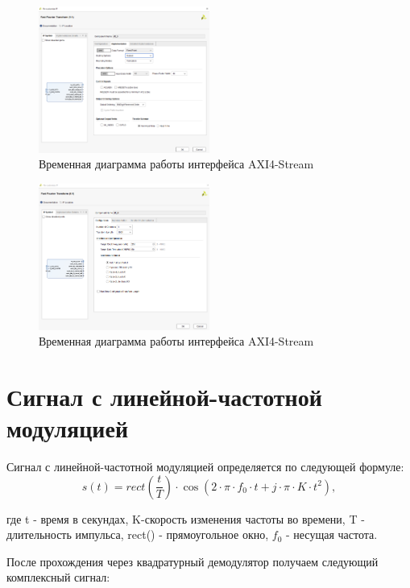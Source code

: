 \begin{figure}[h]
	\centering
	\includegraphics[width=0.5\textwidth]{image/fft_implemetation.png}
	\caption{Временная диаграмма работы интерфейса AXI4-Stream}
	\label{fft_implemetation}
\end{figure}
	
\begin{figure}[h]
	\centering
	\includegraphics[width=0.5\textwidth]{image/fft_config.png}
	\caption{Временная диаграмма работы интерфейса AXI4-Stream}
	\label{fft_detailed_implem}
\end{figure}
	
\section{Сигнал с линейной-частотной модуляцией}

Сигнал с линейной-частотной модуляцией определяется по следующей формуле:
\begin{equation}	
	s(t) = rect(\frac{t}{T}) \cdot \cos(2 \cdot \pi \cdot f_0 \cdot t + j \cdot \pi \cdot K \cdot t^{2}),
\end{equation}

где t - время в секундах, K-скорость изменения частоты во времени, T - длительность импульса, rect() - прямоугольное окно, \(f_0\) - несущая частота.

После прохождения через квадратурный демодулятор получаем следующий комплексный сигнал:

